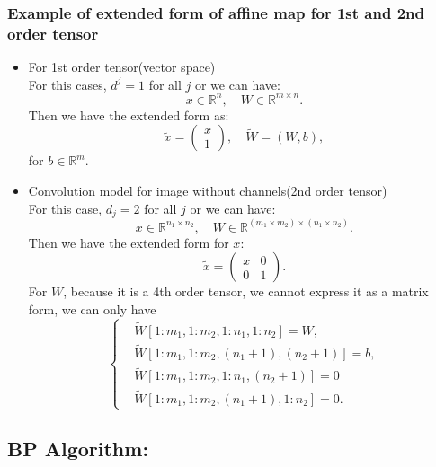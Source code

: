 \subsubsection{Example of extended form of affine map for 1st and 2nd order tensor}
\begin{itemize}
	\item For 1st order tensor(vector space) \\
	For this cases, $d^j = 1$ for all $j$ or we can have:
	\begin{equation}
	x \in \mathbb{R}^{n}, \quad W \in \mathbb{R}^{m \times n}.
	\end{equation}
	Then we have the extended form as:
	\begin{equation}\label{extend:1st}
	\tilde x = \begin{pmatrix}
	x \\
	1
	\end{pmatrix}, \quad \tilde W = (W, b),
	\end{equation}
	for $b \in \mathbb{R}^m$.
	\item Convolution model for image without channels(2nd order tensor) \\
	For this case, $d_j = 2$ for all $j$ or we can have:
	\begin{equation}
	x \in \mathbb{R}^{n_1 \times n_2}, \quad W \in \mathbb{R}^{(m_1\times m_2) \times (n_1\times n_2)}.
	\end{equation}
	Then we have the extended form for $x$:
	\begin{equation}\label{extend:2nd_x}
	\tilde x = \begin{pmatrix}
	x & 0\\
	0 & 1
	\end{pmatrix}.
	\end{equation}
	For $W$, because it is a 4th order tensor, we cannot express it as a matrix form, we can only have
	\begin{equation}\label{extend:2nd_W}
	\begin{cases}
	&\tilde W[1:m_1, 1:m_2,1:n_{1},1:n_{2}] = W, \\
	&\tilde W[1:m_1,1:m_{2},(n_1 + 1), (n_{2} + 1) ] = b, \\
	&\tilde W[1:m_1,1:m_{2},1:n_1, (n_{2} + 1)] = 0 \\
	&\tilde W[1:m_1,1:m_{2}, (n_1+1), 1:n_{2}] = 0.
	\end{cases}
	\end{equation}
\end{itemize}


\subsection{BP Algorithm:}


